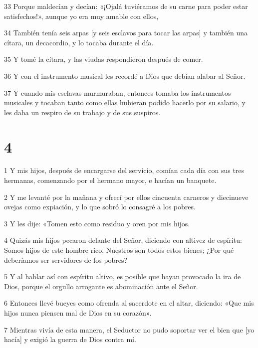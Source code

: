 \par 33 Porque maldecían y decían: «¡Ojalá tuviéramos de su carne para poder estar satisfechos!», aunque yo era muy amable con ellos,

\par 34 También tenía seis arpas [y seis esclavos para tocar las arpas] y también una cítara, un decacordio, y lo tocaba durante el día.

\par 35 Y tomé la cítara, y las viudas respondieron después de comer.

\par 36 Y con el instrumento musical les recordé a Dios que debían alabar al Señor.

\par 37 Y cuando mis esclavas murmuraban, entonces tomaba los instrumentos musicales y tocaban tanto como ellas hubieran podido hacerlo por su salario, y les daba un respiro de su trabajo y de sus suspiros.

\chapter{4}

\par 1 Y mis hijos, después de encargarse del servicio, comían cada día con sus tres hermanas, comenzando por el hermano mayor, e hacían un banquete.

\par 2 Y me levanté por la mañana y ofrecí por ellos cincuenta carneros y diecinueve ovejas como expiación, y lo que sobró lo consagré a los pobres.

\par 3 Y les dije: «Tomen esto como residuo y oren por mis hijos.

\par 4 Quizás mis hijos pecaron delante del Señor, diciendo con altivez de espíritu: Somos hijos de este hombre rico. Nuestros son todos estos bienes; ¿Por qué deberíamos ser servidores de los pobres?

\par 5 Y al hablar así con espíritu altivo, es posible que hayan provocado la ira de Dios, porque el orgullo arrogante es abominación ante el Señor.

\par 6 Entonces llevé bueyes como ofrenda al sacerdote en el altar, diciendo: «Que mis hijos nunca piensen mal de Dios en su corazón».

\par 7 Mientras vivía de esta manera, el Seductor no pudo soportar ver el bien que [yo hacía] y exigió la guerra de Dios contra mí.

